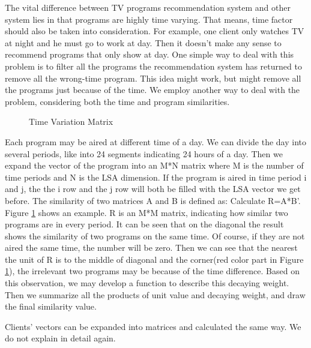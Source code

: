 The vital difference between TV programs recommendation system and other system lies in that programs are highly time varying. That means, time factor should also be taken into consideration. For example, one client only watches TV at night and he must go to work at day. Then it doesn't make any sense to recommend programs that only show at day. One simple way to deal with this problem is to filter all the programs the recommendation system has returned to remove all the wrong-time program. This idea might work, but might remove all the programs just because of the time. We employ another way to deal with the problem, considering both the time and program similarities.
\begin{figure}
\begin{center}
\caption{\label{fig:matrix}Time Variation Matrix}
\end{center}
\end{figure}
Each program may be aired at different time of a day. We can divide the day into several periods, like into 24 segments indicating 24 hours of a day. Then we expand the vector of the program into an M*N matrix where M is the number of time periods and N is the LSA dimension. If the program is aired in time period i and j, the the i row and the j row will both be filled with the LSA vector we get before. The similarity of two matrices A and B is defined as:
Calculate R=A*B'. Figure \ref{fig:matrix} shows an example. R is an M*M matrix, indicating how similar two programs are in every period. It can be seen that on the diagonal the result shows the similarity of two programs on the same time. Of course, if they are not aired the same time, the number will be zero. Then we can see that the nearest the unit of R is to the middle of diagonal and the corner(red color part in Figure \ref{fig:matrix}), the irrelevant two programs may be because of the time difference. Based on this observation, we may develop a function to describe this decaying weight. Then we summarize all the products of unit value and decaying weight, and draw the final similarity value.

Clients' vectors can be expanded into matrices and calculated the same way. We do not explain in detail again.

